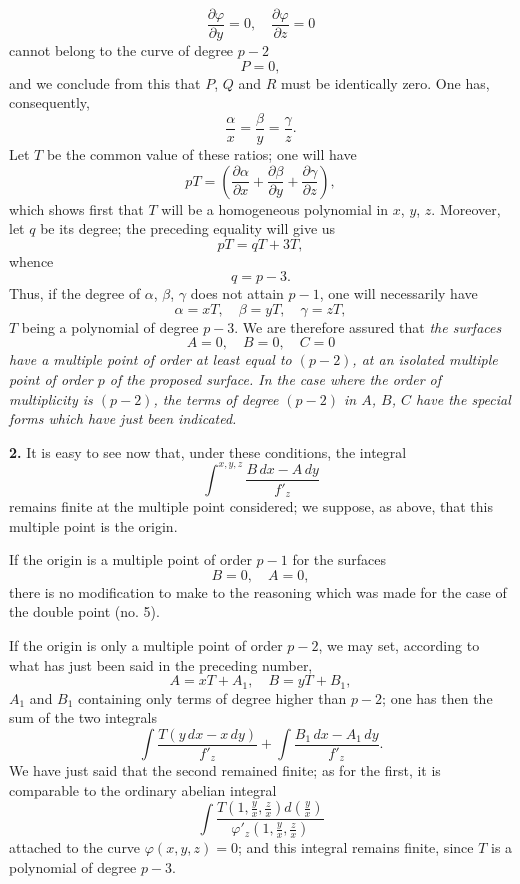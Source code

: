 \documentclass{article}
\begin{document}
\[
\frac{\partial \varphi}{\partial y} = 0, \quad \frac{\partial \varphi}{\partial z} = 0
\]
cannot belong to the curve of degree $p - 2$
\[
P = 0,
\]
and we conclude from this that $P$, $Q$ and $R$ must be identically zero. One has, consequently,
\[
\frac{\alpha}{x} = \frac{\beta}{y} = \frac{\gamma}{z}.
\]
Let $T$ be the common value of these ratios; one will have
\[
pT = \left( \frac{\partial \alpha}{\partial x} + \frac{\partial \beta}{\partial y} + \frac{\partial \gamma}{\partial z} \right),
\]
which shows first that $T$ will be a homogeneous polynomial in $x$, $y$, $z$. Moreover, let $q$ be its degree; the preceding equality will give us
\[
pT = qT + 3T,
\]
whence
\[
q = p - 3.
\]
Thus, if the degree of $\alpha$, $\beta$, $\gamma$ does not attain $p - 1$, one will necessarily have
\[
\alpha = xT, \quad \beta = yT, \quad \gamma = zT,
\]
$T$ being a polynomial of degree $p - 3$. We are therefore assured that \emph{the surfaces}
\[
A = 0, \quad B = 0, \quad C = 0
\]
\emph{have a multiple point of order at least equal to $(p - 2)$, at an isolated multiple point of order $p$ of the proposed surface. In the case where the order of multiplicity is $(p - 2)$, the terms of degree $(p - 2)$ in $A$, $B$, $C$ have the special forms which have just been indicated.}

\textbf{2.} It is easy to see now that, under these conditions, the integral
\[
\int^{x, y, z} \frac{B\,dx - A\,dy}{f'_{z}}
\]
remains finite at the multiple point considered; we suppose, as above, that this multiple point is the origin.

If the origin is a multiple point of order $p - 1$ for the surfaces
\[
B = 0, \quad A = 0,
\]
there is no modification to make to the reasoning which was made for the case of the double point (no. 5).

If the origin is only a multiple point of order $p - 2$, we may set, according to what has just been said in the preceding number,
\[
A = xT + A_{1}, \quad B = yT + B_{1},
\]
$A_{1}$ and $B_{1}$ containing only terms of degree higher than $p - 2$; one has then the sum of the two integrals
\[
\int \frac{T(y\,dx - x\,dy)}{f'_{z}} + \int \frac{B_{1}\,dx - A_{1}\,dy}{f'_{z}}.
\]
We have just said that the second remained finite; as for the first, it is comparable to the ordinary abelian integral
\[
\int \frac{T\left(1, \frac{y}{x}, \frac{z}{x}\right) d\left(\frac{y}{x}\right)}{\varphi'_{z}\left(1, \frac{y}{x}, \frac{z}{x}\right)}
\]
attached to the curve $\varphi(x, y, z) = 0$; and this integral remains finite, since $T$ is a polynomial of degree $p - 3$.
\end{document}
